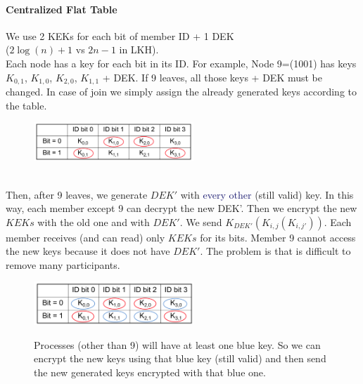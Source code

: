 \documentclass[10pt,a4paper]{article}
\begin{document}
\paragraph{Centralized Flat Table}
We use 2 KEKs for each bit of member ID + 1 DEK \\($2\log(n)+1$ vs $2n-1$ in LKH). \\
Each node has a key for each bit in its ID. For example, Node 9=(1001) has keys $K_{0,1}$, $K_{1,0}$, $K_{2,0}$, $K_{1,1}$ + DEK. If 9 leaves, all those keys + DEK must be changed. In case of join we simply assign the already generated keys according to the table.
\begin{figure}[h!]\hfill \includegraphics[width=170pt]{images/centralized-flat-table.png}\hspace*{\fill}
  \label{fig:centralized-flat-table}
\end{figure} \\
Then, after 9 leaves, we generate $DEK'$ with \textcolor{MidnightBlue}{every other} (still valid) key. In this way, each member except 9 can decrypt the new DEK'. Then we encrypt the new $KEKs$ with the old one and with $DEK'$. We send $K_{DEK'}(K_{i,j}(K_{i,j'}))$. Each member receives (and can read) only $KEKs$ for its bits. Member 9 cannot access the new keys because it does not have $DEK'$. The problem is that is difficult to remove many participants.
\begin{figure}[h!]\hfill \includegraphics[width=170pt]{images/centralized-flat-table2.png}\hspace*{\fill}
  \label{fig:centralized-flat-table2}
  \caption{Processes (other than 9) will have at least one blue key. So we can encrypt the new keys using that blue key (still valid) and then send the new generated keys encrypted with that blue one.}
\end{figure} \\
\end{document}
